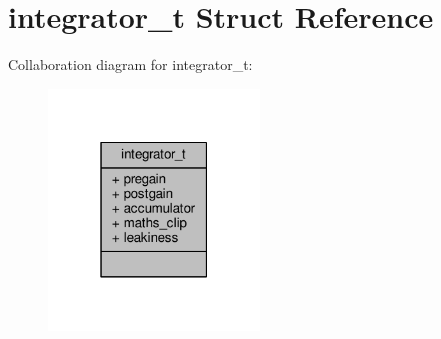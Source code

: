 \hypertarget{structintegrator__t}{\section{integrator\+\_\+t Struct Reference}
\label{structintegrator__t}
}


Collaboration diagram for integrator\+\_\+t\+:
\nopagebreak
\begin{figure}[H]
\begin{center}
\leavevmode
\includegraphics[width=159pt]{structintegrator__t__coll__graph}
\end{center}
\end{figure}
